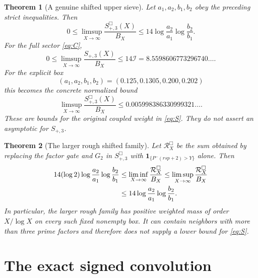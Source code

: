 \documentclass[11pt]{article}
\newtheorem{theorem}{Theorem}[section]
\newcommand{\one}{\mathbf 1}
\newcommand{\phimin}{P^-}
\begin{document}
\begin{theorem}[A genuine shifted upper sieve]\label{th:shifted}
Let $a_1,a_2,b_1,b_2$ obey the preceding strict inequalities.  Then
\begin{equation}\label{eq:boxbound}
 0\le\limsup_{X\to\infty}\frac{S_{+,3}^{\Box}(X)}{B_X}
 \le14\log\frac{a_2}{a_1}\log\frac{b_2}{b_1}.
\end{equation}
For the full sector \eqref{eq:C},
\begin{equation}\label{eq:wholebound}
 0\le\limsup_{X\to\infty}\frac{S_{+,3}(X)}{B_X}
 \le14\mathcal I=8.5598606773296740\ldots .
\end{equation}
For the explicit box
\begin{equation}\label{eq:box}
 (a_1,a_2,b_1,b_2)=(0.125,0.1305,0.200,0.202)
\end{equation}
this becomes the concrete normalized bound
\begin{equation}\label{eq:numericbox}
 \limsup_{X\to\infty}\frac{S_{+,3}^{\Box}(X)}{B_X}
 \le0.005998386330999321\ldots .
\end{equation}
These are bounds for the original \emph{coupled} weight in \eqref{eq:S}.
They do not assert an asymptotic for $S_{+,3}$.
\end{theorem}

\begin{theorem}[The larger rough shifted family]\label{th:rough}
Let $\mathcal R_X^{\Box}$ be the sum obtained by replacing the
factor gate and $G_2$ in $S_{+,3}^{\Box}$ with
$\one_{\{\phimin(rsp+2)>Y\}}$ alone.  Then
\begin{align}\label{eq:rough}
 14(\log2)\log\frac{a_2}{a_1}\log\frac{b_2}{b_1}
 &\le \liminf_{X\to\infty}\frac{\mathcal R_X^{\Box}}{B_X}
 \le\limsup_{X\to\infty}\frac{\mathcal R_X^{\Box}}{B_X}\\
 &\le14\log\frac{a_2}{a_1}\log\frac{b_2}{b_1}.
 \notag
\end{align}
In particular, the larger rough family has positive weighted mass
of order $X/\log X$ on every such fixed nonempty box.  It can contain
neighbors with more than three prime factors and therefore does not
supply a lower bound for \eqref{eq:S}.
\end{theorem}

\section{The exact signed convolution}
\end{document}

